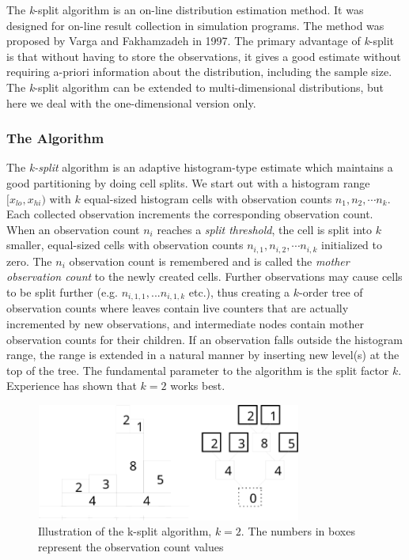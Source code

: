 The \textit{k}-split algorithm is an on-line distribution
estimation method.  It was
designed for on-line result collection in simulation programs.  The
method was proposed by Varga and Fakhamzadeh in 1997. The primary
advantage of \textit{k}-split is that without having to store the
observations, it gives a good estimate without requiring a-priori
information about the distribution, including the sample size. The
\textit{k}-split algorithm can be extended to multi-dimensional
distributions, but here we deal
with the one-dimensional version only.


\subsubsection{The Algorithm}


The \textit{k-split} algorithm is an adaptive histogram-type estimate which
maintains a good partitioning by doing cell splits. We start out with
a histogram range $[x_{lo}, x_{hi})$ with $k$ equal-sized histogram
cells with observation counts $n_1,n_2, \cdots n_k$.  Each collected
observation increments the corresponding observation count. When an
observation count $n_i$ reaches a \textit{split threshold}, the cell
is split into $k$ smaller, equal-sized cells with observation counts
$n_{i,1}, n_{i,2}, \cdots n_{i,k}$ initialized to zero. The $n_i$
observation count is remembered and is called the \textit{mother
  observation count} to the newly created cells. Further observations
may cause cells to be split further (e.g. $n_{i,1,1},...n_{i,1,k}$
etc.), thus creating a $k$-order tree of observation counts where
leaves contain live counters that are actually incremented by new
observations, and intermediate nodes contain mother observation counts
for their children. If an observation falls outside the histogram
range, the range is extended in a natural manner by inserting new
level(s) at the top of the tree. The fundamental parameter to the
algorithm is the split factor $k$. Experience has shown that $k=2$
works best.

\begin{figure}[htbp]
  \begin{center}
    \includegraphics[width=3.442in, height=1.518in]{figures/simlib-ksplit1}
    \caption{Illustration of the k-split algorithm, $k=2$. The
      numbers in boxes represent the observation count values}
  \end{center}
\end{figure}


